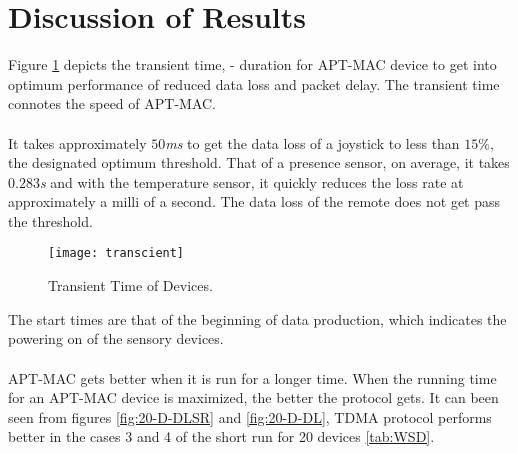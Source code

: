 \section{Discussion of Results}
Figure \ref{fig:transcient} depicts the transient time, - duration for APT-MAC device
to get into optimum performance of reduced data loss and packet delay. The transient
time connotes the speed of APT-MAC.\\\\
It takes approximately $50$\textit{ms} to get the data loss of a joystick to less
than $15\%$, the designated optimum threshold. That of a presence sensor, on average,
it takes $0.283$\textit{s} and with the temperature sensor, it quickly reduces the
loss rate at approximately a milli of a second. The data loss of the remote does not
get pass the threshold. 
\begin{center}
    \begin{figure}[h!]
        \centering
        \texttt{[image: transcient]}
        \caption{Transient Time of Devices.}
        \label{fig:transcient}
    \end{figure}
\end{center}
The start times are that of the beginning of data production, which indicates the
powering on of the sensory devices.\\\\
APT-MAC gets better when it is run for a longer time. When the running time for an
APT-MAC device is maximized, the better the protocol gets. It can been seen from
figures \ref{fig:20-D-DLSR} and \ref{fig:20-D-DL}, TDMA protocol performs better in
the cases 3 and 4 of the short run for 20 devices \ref{tab:WSD}.\\\\
\newline
